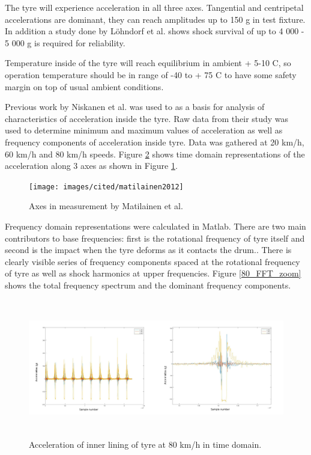 The tyre will experience acceleration in all three axes\cite{Niskanen2014}. Tangential and centripetal accelerations are dominant, they can reach amplitudes up to 150 g in test fixture. In addition a study done by Löhndorf et al. \cite{Lohndorf2007} shows shock survival of up to 4 000 - 5 000 g is required for reliability. 

Temperature inside of the tyre will reach equilibrium in ambient + 5-10 \degree C, so operation temperature should be in range of -40 to + 75 \degree C to have some safety margin on top of usual ambient conditions. 

Previous work by Niskanen et al. \cite{Niskanen2014} was used to as a basis for analysis of characteristics of acceleration inside the tyre. Raw data from their study was used to determine minimum and maximum values of acceleration as well as frequency components of acceleration inside tyre. Data was gathered at 20 km/h, 60 km/h and 80 km/h speeds. Figure \ref{80_TD} shows time domain representations of the acceleration along 3 axes as shown in Figure \ref{tyre_axes}.

\begin{figure}[htb]
\begin{center}
\texttt{[image: images/cited/matilainen2012]}
\end{center}
\caption{Axes in measurement by Matilainen et al. \cite{Matilainen2012}}
\label{tyre_axes}
\end{figure}

Frequency domain representations were calculated in Matlab. There are two main contributors to base frequencies: first is the rotational frequency of tyre itself and second is the impact when the tyre deforms as it contacts the drum.. There is clearly visible series of frequency components spaced at the rotational frequency of tyre as well as shock harmonics at upper frequencies. Figure \ref{80_FFT_zoom} shows the total frequency spectrum and the dominant frequency components.

\begin{figure}[htb]
\begin{center}
\includegraphics[height=6cm]{images/matlab_figures/80kmh_timedomain_combined}
\end{center}
\caption{Acceleration of inner lining of tyre at 80 km/h in time domain.}
\label{80_TD}
\end{figure}

